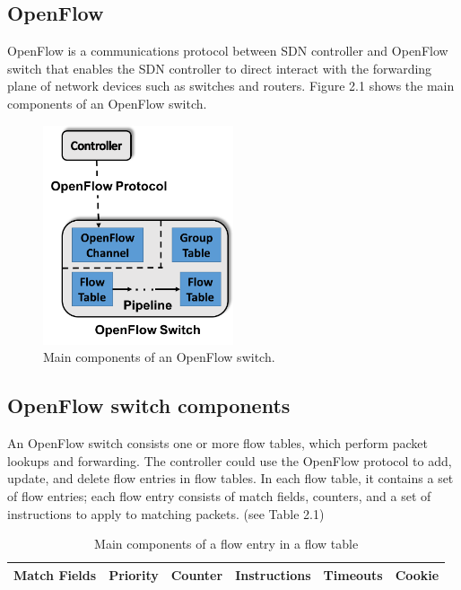 \documentclass[a4paper,12pt]{report}
\begin{document}
\begin{large}
        \section{OpenFlow}
        \qquad OpenFlow is a communications protocol between SDN controller and OpenFlow switch that enables the SDN 
                controller to direct interact with the forwarding plane of network devices such as switches and 
                routers. Figure 2.1 shows the main components of an OpenFlow switch.
        \begin{figure}[hb]
          \caption{Main components of an OpenFlow switch.}
          \centering
            \includegraphics[width=0.5\textwidth]{OpenFlow.png}
        \end{figure}
        \subsection{OpenFlow switch components}
        \qquad An OpenFlow switch consists one or more flow tables, which perform packet lookups and forwarding. The controller could use the OpenFlow protocol to add, update, and delete flow entries in flow tables. In each flow table, it contains a set of flow entries; each flow entry consists of match fields, counters, and a set of instructions to apply to matching packets. (see Table 2.1)\\
        \begin{table}
          \centering
          \begin{tabular}[c]{|l|l|l|l|l|l|}
          \hline
          Match Fields & Priority & Counter & Instructions & Timeouts & Cookie \\
          \hline
          \end{tabular}
          \caption{Main components of a flow entry in a flow table}
        \end{table}

\end{large}
\end{document}
